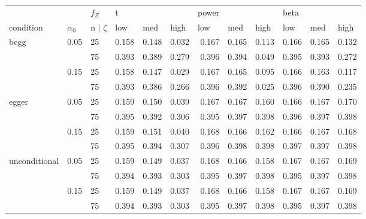 \begin{tabular}{lll |rrrrrrrrr}
  \hline
               &             & $f_Z$               & \multicolumn{1}{l}{     t} & \multicolumn{1}{l}{      } & \multicolumn{1}{l}{      } & \multicolumn{1}{l}{ power} & \multicolumn{1}{l}{      } & \multicolumn{1}{l}{      } & \multicolumn{1}{l}{  beta} & \multicolumn{1}{l}{      } & \multicolumn{1}{l}{      } \\ 
  condition     & $\alpha_0$ & n $\vert$ $\zeta$ & \multicolumn{1}{l}{   low} & \multicolumn{1}{l}{   med} & \multicolumn{1}{l}{  high} & \multicolumn{1}{l}{   low} & \multicolumn{1}{l}{   med} & \multicolumn{1}{l}{  high} & \multicolumn{1}{l}{   low} & \multicolumn{1}{l}{   med} & \multicolumn{1}{l}{  high} \\ 
   \hline
begg          & 0.05        & 25                  & 0.158 & 0.148 & 0.032 & 0.167 & 0.165 & 0.113 & 0.166 & 0.165 & 0.132 \\ 
                &             & 75                  & 0.393 & 0.389 & 0.279 & 0.396 & 0.394 & 0.049 & 0.395 & 0.393 & 0.272 \\ 
                & 0.15        & 25                  & 0.158 & 0.147 & 0.029 & 0.167 & 0.165 & 0.095 & 0.166 & 0.163 & 0.117 \\ 
                &             & 75                  & 0.393 & 0.386 & 0.266 & 0.396 & 0.392 & 0.025 & 0.396 & 0.390 & 0.235 \\ 
  egger         & 0.05        & 25                  & 0.159 & 0.150 & 0.039 & 0.167 & 0.167 & 0.160 & 0.166 & 0.167 & 0.170 \\ 
                &             & 75                  & 0.395 & 0.392 & 0.306 & 0.395 & 0.397 & 0.398 & 0.396 & 0.397 & 0.398 \\ 
                & 0.15        & 25                  & 0.159 & 0.151 & 0.040 & 0.168 & 0.166 & 0.162 & 0.166 & 0.167 & 0.168 \\ 
                &             & 75                  & 0.395 & 0.394 & 0.307 & 0.396 & 0.398 & 0.398 & 0.397 & 0.397 & 0.398 \\ 
  unconditional & 0.05        & 25                  & 0.159 & 0.149 & 0.037 & 0.168 & 0.166 & 0.158 & 0.167 & 0.167 & 0.169 \\ 
                &             & 75                  & 0.394 & 0.393 & 0.303 & 0.395 & 0.397 & 0.398 & 0.395 & 0.397 & 0.398 \\ 
                & 0.15        & 25                  & 0.159 & 0.149 & 0.037 & 0.168 & 0.166 & 0.158 & 0.167 & 0.167 & 0.169 \\ 
                &             & 75                  & 0.394 & 0.393 & 0.303 & 0.395 & 0.397 & 0.398 & 0.395 & 0.397 & 0.398 \\ 
   \hline
\end{tabular}
